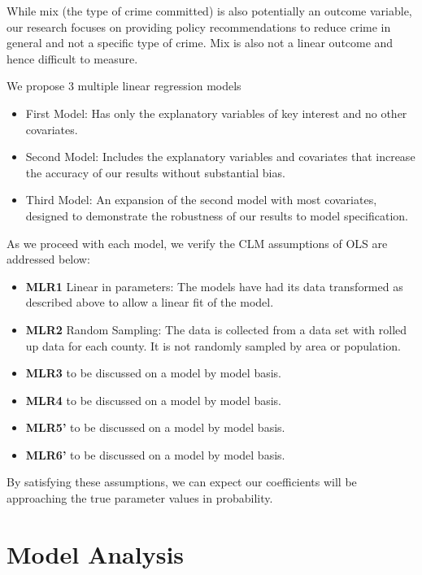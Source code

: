 \documentclass[]{article}
\begin{document}
While mix (the type of crime committed) is also potentially an outcome
variable, our research focuses on providing policy recommendations to
reduce crime in general and not a specific type of crime. Mix is also
not a linear outcome and hence difficult to measure.

We propose 3 multiple linear regression models

\begin{itemize}
\item
  First Model: Has only the explanatory variables of key interest and no
  other covariates.
\item
  Second Model: Includes the explanatory variables and covariates that
  increase the accuracy of our results without substantial bias.
\item
  Third Model: An expansion of the second model with most covariates,
  designed to demonstrate the robustness of our results to model
  specification.
\end{itemize}

As we proceed with each model, we verify the CLM assumptions of OLS are
addressed below:

\begin{itemize}
\item
  \textbf{MLR1} Linear in parameters: The models have had its data
  transformed as described above to allow a linear fit of the model.
\item
  \textbf{MLR2} Random Sampling: The data is collected from a data set
  with rolled up data for each county. It is not randomly sampled by
  area or population.
\item
  \textbf{MLR3} to be discussed on a model by model basis.
\item
  \textbf{MLR4} to be discussed on a model by model basis.
\item
  \textbf{MLR5'} to be discussed on a model by model basis.
\item
  \textbf{MLR6'} to be discussed on a model by model basis.
\end{itemize}

By satisfying these assumptions, we can expect our coefficients will be
approaching the true parameter values in probability.

\hypertarget{model-analysis}{%
\section{Model Analysis}\label{model-analysis}}
\end{document}
